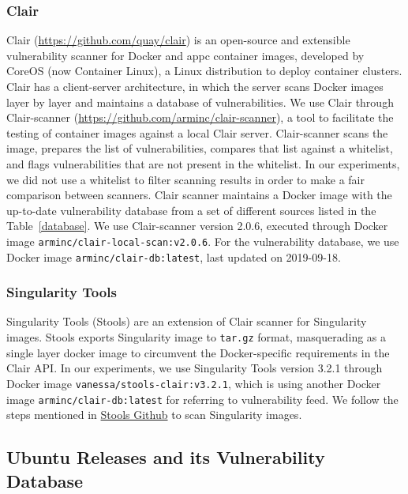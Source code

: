 \documentclass[a4paper,num-refs]{oup-contemporary}
\begin{document}
\subsubsection{Clair}

Clair (\url{https://github.com/quay/clair}) is an open-source and extensible
vulnerability scanner for Docker and appc container images, developed by
CoreOS (now Container Linux), a Linux distribution to deploy container
clusters. Clair has a client-server architecture, in which the server
scans Docker images layer by layer and maintains a database of vulnerabilities. We use Clair through Clair-scanner
(\url{https://github.com/arminc/clair-scanner}), a tool to facilitate the testing
of container images against a local Clair server. Clair-scanner scans the image,
prepares the list of vulnerabilities, compares that list against a
whitelist, and flags vulnerabilities that are not present in the whitelist.
In our experiments, we did not use a whitelist to filter scanning results in
order to make a fair comparison between scanners.
Clair scanner maintains a Docker image with the up-to-date vulnerability
database from a set of different sources listed in the Table~\ref{database}.
We use Clair-scanner version 2.0.6, executed through
Docker image \texttt{arminc/clair-local-scan:v2.0.6}. For the vulnerability
database, we use Docker image \texttt{arminc/clair-db:latest}, last
updated on 2019-09-18.

\subsubsection{Singularity Tools}

Singularity Tools (Stools)
are an extension of Clair scanner for Singularity images. Stools
exports Singularity image to \texttt{tar.gz} format, masquerading as a single layer docker image
to circumvent the Docker-specific requirements in the Clair API.
In our experiments, we use Singularity Tools version 3.2.1 through Docker
image
\texttt{vanessa/stools-clair:v3.2.1}, which is using another Docker
image \texttt{arminc/clair-db:latest} for referring to vulnerability feed.
We follow the steps mentioned in
\href{https://github.com/singularityhub/stools}{Stools Github} to scan
Singularity images. 

\subsection{Ubuntu Releases and its Vulnerability Database}
\end{document}
